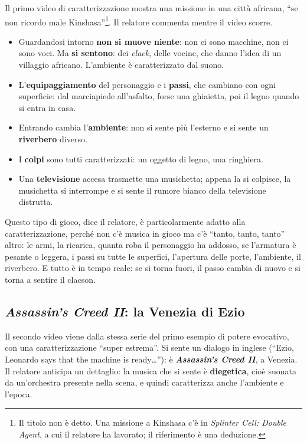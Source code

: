 Il primo video di caratterizzazione mostra una missione in una città africana,
``se non ricordo male Kinshasa''\footnote{Il titolo non è detto. Una missione a
Kinshasa c'è in \emph{Splinter Cell: Double Agent}, a cui il relatore ha
lavorato; il riferimento è una deduzione.}. Il relatore commenta mentre il video
scorre.
\begin{itemize}
  \item Guardandosi intorno \textbf{non si muove niente}: non ci sono macchine,
        non ci sono voci. Ma \textbf{si sentono}: dei \emph{clack}, delle vocine,
        che danno l'idea di un villaggio africano. L'ambiente è caratterizzato
        dal suono.
  \item L'\textbf{equipaggiamento} del personaggio e i \textbf{passi}, che
        cambiano con ogni superficie: dal marciapiede all'asfalto, forse una
        ghiaietta, poi il legno quando si entra in casa.
  \item Entrando cambia l'\textbf{ambiente}: non si sente più l'esterno e si
        sente un \textbf{riverbero} diverso.
  \item I \textbf{colpi} sono tutti caratterizzati: un oggetto di legno, una
        ringhiera.
  \item Una \textbf{televisione} accesa trasmette una musichetta; appena la si
        colpisce, la musichetta si interrompe e si sente il rumore bianco della
        televisione distrutta.
\end{itemize}
Questo tipo di gioco, dice il relatore, è particolarmente adatto alla
caratterizzazione, perché non c'è musica in gioco ma c'è ``tanto, tanto, tanto''
altro: le armi, la ricarica, quanta roba il personaggio ha addosso, se
l'armatura è pesante o leggera, i passi su tutte le superfici, l'apertura delle
porte, l'ambiente, il riverbero. E tutto è in tempo reale: se si torna fuori, il
passo cambia di nuovo e si torna a sentire il clacson.

\subsection{\emph{Assassin's Creed II}: la Venezia di Ezio}

Il secondo video viene dalla stessa serie del primo esempio di potere evocativo,
con una caratterizzazione ``super estrema''. Si sente un dialogo in inglese
(``Ezio, Leonardo says that the machine is ready\ldots''): è
\textbf{\emph{Assassin's Creed II}}, a Venezia. Il relatore anticipa un dettaglio:
la musica che si sente è \textbf{diegetica}, cioè suonata da un'orchestra
presente nella scena, e quindi caratterizza anche l'ambiente e l'epoca.

